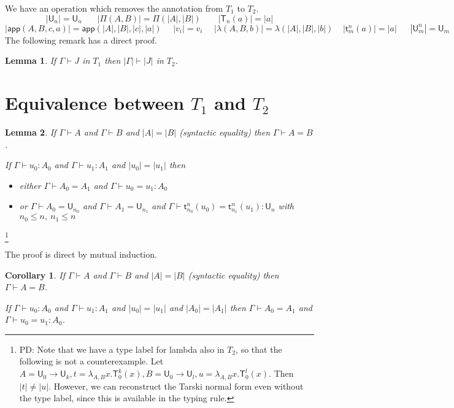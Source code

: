 \documentclass[11pt,a4paper]{article}
\newtheorem{corollary}{Corollary}[theorem]
\newtheorem{lemma}{Lemma}[theorem]
\theoremstyle{definition}
\def\UU{\mathsf{U}}
\newcommand{\LAM}{\lambda}
\newcommand{\APP}{\mathsf{app}}
\newcommand{\T}{\mathsf{T}}
\newcommand{\sT}{\mathsf{t}}
\begin{document}
\medskip

We have an operation which removes the annotation from $T_1$ to $T_2$.
$$
|\UU_n| = \UU_n~~~~~~~~|\Pi(A,B)| = \Pi(|A|,|B|)~~~~~~~~~|\T_n(a)| = |a|
$$
$$
|\APP(A,B,c,a)| = \APP(|A|,|B|,|c|,|a|)~~~~~~|v_i| = v_i~~~~~~|\LAM(A,B,b)| = \lambda(|A|,|B|,|b|)~~~~~|\sT_m^n(a)| = |a|
~~~~~~~|\UU^n_m| = \UU_m
$$
The following remark has a direct proof.

\begin{lemma}
  If $\Gamma\vdash J$ in $T_1$ then $|\Gamma|\vdash |J|$ in $T_2$.
\end{lemma}


\section{Equivalence between $T_1$ and $T_2$}

\begin{lemma}
  If $\Gamma\vdash A$ and $\Gamma\vdash B$ and $|A|=|B|$ (syntactic equality) then $\Gamma\vdash A = B$.

    If $\Gamma\vdash u_0:A_0$ and $\Gamma\vdash u_1:A_1$ and $|u_0| = |u_1|$ then
  \begin{itemize}
    \item either $\Gamma\vdash A_0 = A_1$
      and $\Gamma\vdash u_0 = u_1:A_0$
    \item or $\Gamma\vdash A_0 = \UU_{n_0}$ and $\Gamma\vdash A_1 = \UU_{n_1}$ and $\Gamma\vdash \sT_{n_0}^n(u_0) = \sT_{n_1}^n(u_1):\UU_n$ with $n_0\leqslant n,~n_1\leqslant n$
  \end{itemize}
\end{lemma}
\footnote{PD: Note that we have a type label for lambda also in $T_2$, so that the following is not a counterexample. Let $A = \UU_0 \to \UU_k, t = \lambda_{A,B} x.\T^k_0(x), B =  \UU_0 \to \UU_l, u = \lambda_{A,B} x.\T^l_0(x)$. Then $|t| \neq |u|$. However, we can reconstruct the Tarski normal form even without the type label, since this is available in the typing rule.}

 The proof is direct by mutual induction.

\begin{corollary}
  If $\Gamma\vdash A$ and $\Gamma\vdash B$ and $|A|=|B|$ (syntactic equality) then $\Gamma\vdash A = B$.

    If $\Gamma\vdash u_0:A_0$ and $\Gamma\vdash u_1:A_1$ and $|u_0| = |u_1|$ and $|A_0| = |A_1|$ then $\Gamma\vdash A_0=A_1$ and $\Gamma\vdash u_0 = u_1:A_0$.
\end{corollary}
\end{document}

